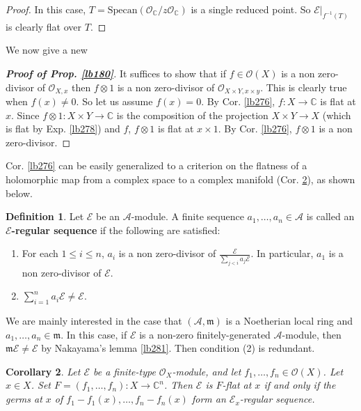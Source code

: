 \documentclass[12pt,b5paper,notitlepage]{report}
\theoremstyle{definition}
\newtheorem{df}{Definition}[section]
\theoremstyle{plain}
\newtheorem{co}[df]{Corollary}
\newcommand{\mc}{\mathcal}
\newcommand{\scr}{\mathscr}
\newcommand{\Cbb}{\mathbb C}
\newcommand{\Specan}{\mathrm{Specan}}
\newcommand{\mk}{\mathfrak m}
\numberwithin{equation}{section}
\begin{document}
\begin{proof}
In this case, $T=\Specan(\scr O_\Cbb/z\scr O_\Cbb)$ is a single reduced point. So $\scr E|_{f^{-1}(T)}$ is clearly flat over $T$.
\end{proof}


We now give a new

\begin{proof}[\textbf{Proof of Prop. \ref{lb180}}]
It suffices to show that if $f\in\scr O(X)$ is a non zero-divisor of $\scr O_{X,x}$ then $f\otimes 1$ is a non zero-divisor of $\scr O_{X\times Y,x\times y}$. This is clearly true when $f(x)\neq 0$. So let us assume $f(x)=0$. By Cor. \ref{lb276}, $f:X\rightarrow\Cbb$ is flat at $x$. Since $f\otimes 1:X\times Y\rightarrow\Cbb$ is the composition of the projection $X\times Y\rightarrow X$ (which is flat by Exp. \ref{lb278}) and $f$, $f\otimes 1$ is flat at $x\times 1$. By Cor. \ref{lb276}, $f\otimes 1$ is a non zero-divisor.
\end{proof}


Cor. \ref{lb276} can be easily generalized to a criterion on the flatness of a holomorphic map from a complex space to a complex manifold (Cor. \ref{lb279}), as shown below.


\begin{df}
Let $\mc E$ be an $\mc A$-module. A finite sequence $a_1,\dots,a_n\in\mc A$ is called an \textbf{$\mc E$-regular sequence}  if the following are satisfied:
\begin{enumerate}[label=(\arabic*)]
\item For each $1\leq i\leq n$, $a_i$ is a non zero-divisor of $\displaystyle\frac{\mc E}{\sum_{j<i}a_j\mc E}$. In particular, $a_1$ is a non zero-divisor of $\mc E$.
\item $\sum_{i=1}^n a_i\mc E\neq \mc E$.
\end{enumerate}
\end{df}


We are mainly interested in the case that $(\mc A,\mk)$ is a Noetherian local ring and $a_1,\dots,a_n\in\mk$. In this case, if $\mc E$ is a non-zero finitely-generated $\mc A$-module, then $\mk\mc E\neq\mc E$ by Nakayama's lemma \ref{lb281}. Then condition (2) is redundant.


\begin{co}\label{lb279}
Let $\scr E$ be a finite-type $\scr O_X$-module, and let $f_1,\dots,f_n\in\scr O(X)$. Let $x\in X$. Set $F=(f_1,\dots,f_n):X\rightarrow\Cbb^n$. Then $\scr E$ is $F$-flat at $x$ if and only if the germs at $x$ of $f_1-f_1(x),\dots,f_n-f_n(x)$ form an $\scr E_x$-regular sequence.
\end{co}
\end{document}
